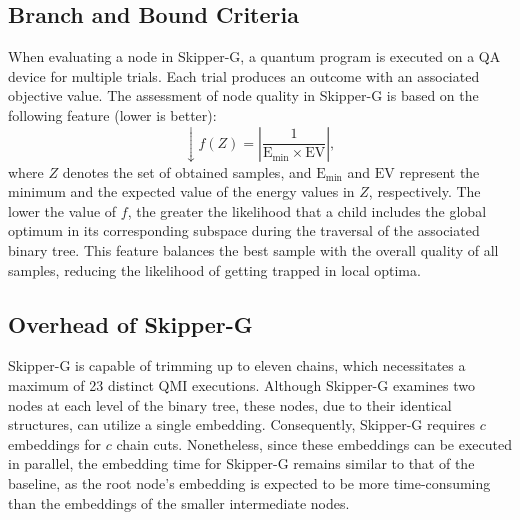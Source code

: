 \subsection{Branch and Bound Criteria}


When evaluating a node in Skipper-G, a quantum program is executed on a QA device for multiple trials. 
Each trial produces an outcome with an associated objective value. 
The assessment of node quality in Skipper-G is based on the following feature (lower is better):
\begin{equation}
    \downarrow f(Z) = \left| \frac{1}{\text{E}_{\text{min}} \times \text{EV}} \right|,
    \label{eq:m2_f}
\end{equation}
where $Z$ denotes the set of obtained samples, and $\text{E}_{\text{min}}$ and $\text{EV}$ represent the minimum and the expected value of the energy values in $Z$, respectively. 
The lower the value of $f$, the greater the likelihood that a child includes the global optimum in its corresponding subspace during the traversal of the associated binary tree. 
This feature balances the best sample with the overall quality of all samples, reducing the likelihood of getting trapped in local optima.


\subsection{Overhead of Skipper-G}

Skipper-G is capable of trimming up to eleven chains, which necessitates a maximum of 23 distinct QMI executions.
Although Skipper-G examines two nodes at each level of the binary tree, these nodes, due to their identical structures, can utilize a single embedding. 
Consequently, Skipper-G requires $c$ embeddings for $c$ chain cuts. 
Nonetheless, since these embeddings can be executed in parallel, the embedding time for Skipper-G remains similar to that of the baseline, as the root node's embedding is expected to be more time-consuming than the embeddings of the smaller intermediate nodes.


